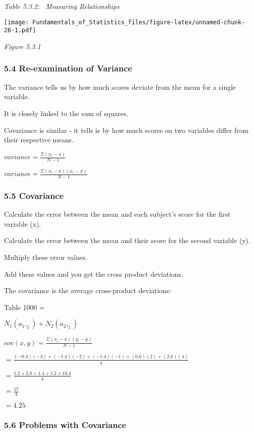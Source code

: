 \documentclass[]{article}
\begin{document}
\emph{Table 5.3.2: ~Measuring Relationships}

\texttt{[image: Fundamentals\_of\_Statistics\_files/figure-latex/unnamed-chunk-26-1.pdf]}

\emph{Figure 5.3.1}

\hypertarget{re-examination-of-variance}{%
\subsubsection{5.4 Re-examination of
Variance}\label{re-examination-of-variance}}

The variance tells us by how much scores deviate from the mean for a
single variable.

It is closely linked to the sum of squares.

Covariance is similar - it tells is by how much scores on two variables
differ from their respective means.

\(variance=\frac{\Sigma(x_i - \bar{x})}{N-1}\)

\(variance=\frac{\Sigma(x_i - \bar{x})(x_i - \bar{x})}{N-1}\)

\hypertarget{covariance}{%
\subsubsection{5.5 Covariance}\label{covariance}}

Calculate the error between the mean and each subject's score for the
first variable (x).

Calculate the error between the mean and their score for the second
variable (y).

Multiply these error values.

Add these values and you get the cross product deviations.

The covariance is the average cross-product deviations:

Table 1000 =

\(N_1(a_1,_1) + N_2(a_2,_1)\)

\(cov(x,y)=\frac{\Sigma(x_i - \bar{x})(y_i - \bar{y})}{N-1}\)

\(=\frac{(-0.4)(-3)+(-1.4)(-2)+(-1.4)(-1)+(0.6)(2)+(2.6)(4)}{4}\)

\(=\frac{1.2+2.8+1.4+1.2+10.4}{4}\)

\(=\frac{17}{4}\)

\(=4.25\)

\hypertarget{problems-with-covariance}{%
\subsubsection{5.6 Problems with
Covariance}\label{problems-with-covariance}}
\end{document}

